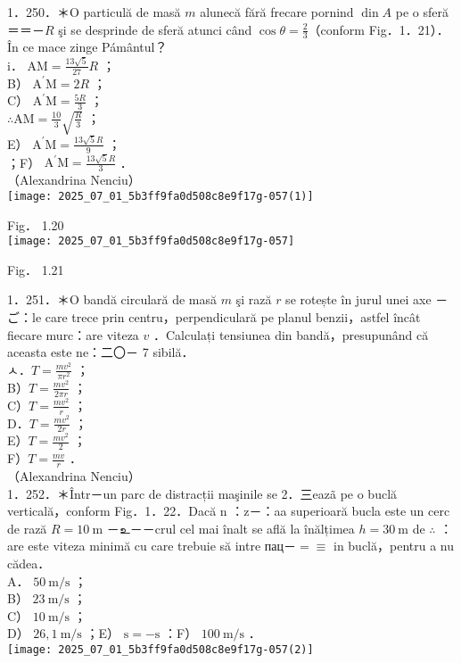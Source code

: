 {1．250．＊O particulă de masă $m$ alunecă fără frecare pornind $\operatorname{din} A$ pe o sferă ＝＝－$R$ şi se desprinde de sferă atunci când $\cos \theta=\frac{2}{3}$（conform Fig．1．21）．În ce mace zinge Pámântul？\\
i． $\mathrm{AM}=\frac{13 \sqrt{5}}{27} R$ ；\\
B） $\mathrm{A}^{\prime} \mathrm{M}=2 R$ ；\\
C） $\mathrm{A}^{\prime} \mathrm{M}=\frac{5 R}{3}$ ；\\
$\therefore \mathrm{AM}=\frac{10}{3} \sqrt{\frac{R}{3}}$ ；\\
E） $\mathrm{A}^{\prime} \mathrm{M}=\frac{13 \sqrt{5} R}{9}$ ；\\
；F） $\mathrm{A}^{\prime} \mathrm{M}=\frac{13 \sqrt{5} R}{3}$ ．\\
（Alexandrina Nenciu）\\
\texttt{[image: 2025\_07\_01\_5b3ff9fa0d508c8e9f17g-057(1)]}

Fig． 1.20\\
\texttt{[image: 2025\_07\_01\_5b3ff9fa0d508c8e9f17g-057]}

Fig． 1.21

1．251．＊O bandă circulară de masă $m$ şi rază $r$ se rotește în jurul unei axe －ご：le care trece prin centru，perpendiculară pe planul benzii，astfel încât fiecare murc：are viteza $v$ ．Calculați tensiunea din bandă，presupunând că aceasta este ne：二〇－ 7 sibilă．\\
ㅅ．$T=\frac{m v^{2}}{\pi r^{2}}$ ；\\
B）$T=\frac{m v^{2}}{2 \pi r}$ ；\\
C）$T=\frac{m v^{2}}{r}$ ；\\
D．$T=\frac{m v^{2}}{2 r}$ ；\\
E）$T=\frac{m v^{2}}{2}$ ；\\
F）$T=\frac{m v}{r}$ ．\\
（Alexandrina Nenciu）\\
1．252．＊Într－un parc de distracții maşinile se 2．三eazã pe o buclă verticală，conform Fig．1．22．Dacă n ：z－：aa superioară bucla este un cerc de rază $R=10 \mathrm{~m}$ －உ－－crul cel mai înalt se află la înălțimea $h=30 \mathrm{~m}$ de $\therefore$ ：are este viteza minimă cu care trebuie să intre пац－$=\equiv$ in buclă，pentru a nu cădea．\\
A． $50 \mathrm{~m} / \mathrm{s}$ ；\\
B） $23 \mathrm{~m} / \mathrm{s}$ ；\\
C） $10 \mathrm{~m} / \mathrm{s}$ ；\\
D） $26,1 \mathrm{~m} / \mathrm{s}$ ；E） $\mathrm{s}=-\mathrm{s}$ ：F） $100 \mathrm{~m} / \mathrm{s}$ ．\\
\texttt{[image: 2025\_07\_01\_5b3ff9fa0d508c8e9f17g-057(2)]}

}
